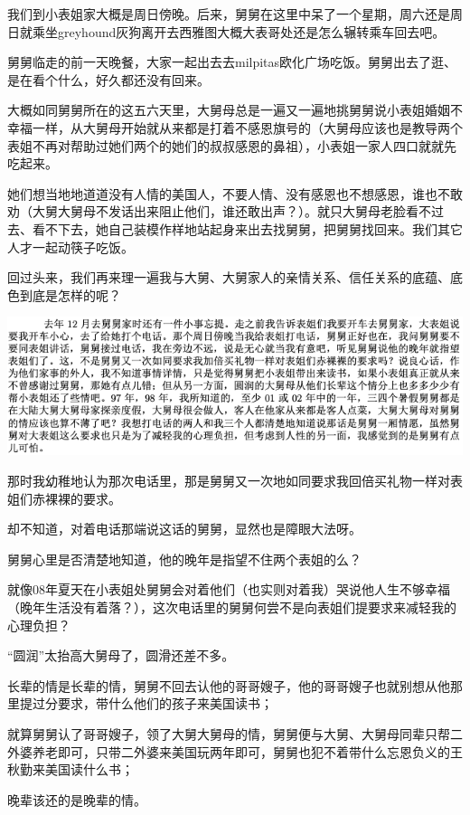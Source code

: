 \documentclass[9pt, b5paper]{article}
\begin{document}
我们到小表姐家大概是周日傍晚。后来，舅舅在这里中呆了一个星期，周六还是周日就乘坐greyhound灰狗离开去西雅图大概大表哥处还是怎么辗转乘车回去吧。 

舅舅临走的前一天晚餐，大家一起出去去milpitas欧化广场吃饭。舅舅出去了逛、是在看个什么，好久都还没有回来。

大概如同舅舅所在的这五六天里，大舅母总是一遍又一遍地挑舅舅说小表姐婚姻不幸福一样，从大舅母开始就从来都是打着不感恩旗号的（大舅母应该也是教导两个表姐不再对帮助过她们两个的她们的叔叔感恩的鼻祖），小表姐一家人四口就就先吃起来。

她们想当地地道道没有人情的美国人，不要人情、没有感恩也不想感恩，谁也不敢劝（大舅大舅母不发话出来阻止他们，谁还敢出声？）。就只大舅母老脸看不过去、看不下去，她自己装模作样地站起身来出去找舅舅，把舅舅找回来。我们其它人才一起动筷子吃饭。 

回过头来，我们再来理一遍我与大舅、大舅家人的亲情关系、信任关系的底蕴、底色到底是怎样的呢？

\begin{center}
\includegraphics[width=.9\linewidth]{./pic/p1p46-3.png}
\end{center}

那时我幼稚地认为那次电话里，那是舅舅又一次地如同要求我回倍买礼物一样对表姐们赤裸裸的要求。

却不知道，对着电话那端说这话的舅舅，显然也是障眼大法呀。

舅舅心里是否清楚地知道，他的晚年是指望不住两个表姐的么？

就像08年夏天在小表姐处舅舅会对着他们（也实则对着我）哭说他人生不够幸福（晚年生活没有着落？），这次电话里的舅舅何尝不是向表姐们提要求来减轻我的心理负担？

“圆润”太抬高大舅母了，圆滑还差不多。 

长辈的情是长辈的情，舅舅不回去认他的哥哥嫂子，他的哥哥嫂子也就别想从他那里提过分要求，带什么他们的孩子来美国读书；

就算舅舅认了哥哥嫂子，领了大舅大舅母的情，舅舅便与大舅、大舅母同辈只帮二外婆养老即可，只带二外婆来美国玩两年即可，舅舅也犯不着带什么忘恩负义的王秋勤来美国读什么书；

晚辈该还的是晚辈的情。
\end{document}
